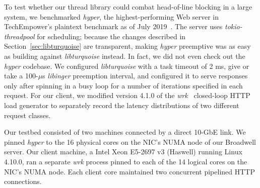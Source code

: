 To test whether our thread library could combat head-of-line blocking in a large
system, we benchmarked
\textit{hyper}, the highest-performing Web server in TechEmpower's plaintext
benchmark as of July 2019~\cite{www-hyper}.  The server uses
\textit{tokio-threadpool} for scheduling; because the changes described in
Section~\ref{sec:libturquoise} are transparent, making \textit{hyper} preemptive was
as easy as building against \textit{libturquoise} instead.  In fact, we did not even
check out the \textit{hyper} codebase.  We configured \textit{libturquoise} with a
task timeout of 2 ms, give or take a
100-$\mu$s \textit{libinger} preemption interval, and configured it to serve
responses only after spinning in a busy loop for a number of iterations specified in
each request.  For our client, we modified version 4.1.0 of the
\textit{wrk}~\cite{www-wrk} closed-loop HTTP load generator to separately record the
latency distributions of two different request classes.

Our testbed consisted of two machines connected by a direct 10-GbE link.  We pinned
\textit{hyper} to the 16 physical cores on the NIC's NUMA node of our Broadwell
server.  Our client machine, a Intel Xeon E5-2697 v3 (Haswell) running Linux 4.10.0,
ran a separate \textit{wrk} process pinned to each of the 14 logical cores on the
NIC's NUMA node.  Each client core maintained two concurrent pipelined HTTP
connections.

